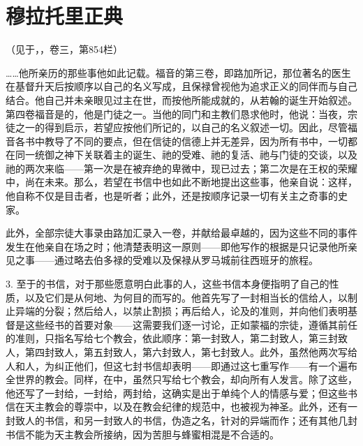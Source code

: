 
\section{穆拉托里正典}

（见于，，卷三，第854栏）\par

……他所亲历的那些事他如此记载。福音的第三卷，即路加所记，那位著名的医生在基督升天后按顺序以自己的名义写成，且保禄曾视他为追求正义的同伴而与自己结合。他自己并未亲眼见过主在世，而按他所能成就的，从若翰的诞生开始叙述。第四卷福音是的，他是门徒之一。当他的同门和主教们恳求他时，他说：当夜，宗徒之一的得到启示，若望应按他们所记的，以自己的名义叙述一切。因此，尽管福音各书中教导了不同的要点，但在信徒的信德上并无差异，因为所有书中，一切都在同一统御之神下关联着主的诞生、祂的受难、祂的复活、祂与门徒的交谈，以及祂的两次来临——第一次是在被弃绝的卑微中，现已过去；第二次是在王权的荣耀中，尚在未来。那么，若望在书信中也如此不断地提出这些事，他亲自说：这样，他自称不仅是目击者，也是听者；此外，还是按顺序记录一切有关主之奇事的史家。\par

此外，全部宗徒大事录由路加汇录入一卷，并献给最卓越的，因为这些不同的事件发生在他亲自在场之时；他清楚表明这一原则——即他写作的根据是只记录他所亲见之事——通过略去伯多禄的受难以及保禄从罗马城前往西班牙的旅程。\par

3. 至于的书信，对于那些愿意明白此事的人，这些书信本身便指明了自己的性质，以及它们是从何地、为何目的而写的。他首先写了一封相当长的信给人，以制止异端的分裂；然后给人，以禁止割损；再后给人，论及的准则，并向他们表明基督是这些经书的首要对象——这需要我们逐一讨论，正如蒙福的宗徒，遵循其前任的准则，只指名写给七个教会，依此顺序：第一封致人，第二封致人，第三封致人，第四封致人，第五封致人，第六封致人，第七封致人。此外，虽然他两次写给人和人，为纠正他们，但这七封书信却表明——即通过这七重写作——有一个遍布全世界的教会。同样，在中，虽然只写给七个教会，却向所有人发言。除了这些，他还写了一封给，一封给，两封给，这确实是出于单纯个人的情感与爱；但这些书信在天主教会的尊崇中，以及在教会纪律的规范中，也被视为神圣。此外，还有一封致人的书信，和另一封致人的书信，伪造之名，针对的异端而作；还有其他几封书信不能为天主教会所接纳，因为苦胆与蜂蜜相混是不合适的。\par

